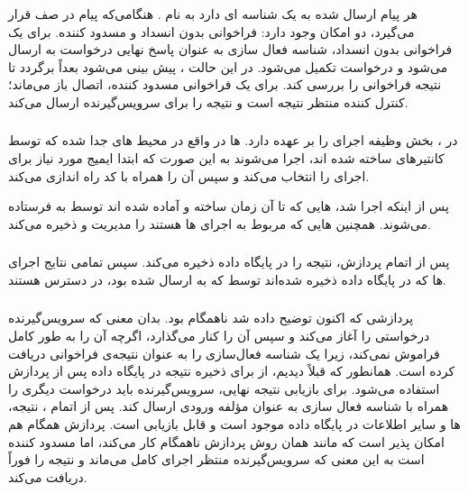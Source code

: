 هر پیام ارسال شده به یک  شناسه ای دارد به نام . هنگامی‌که پیام در صف  قرار می‌گیرد، دو امکان وجود دارد: فراخوانی بدون انسداد و مسدود کننده. برای یک فراخوانی بدون انسداد‌، شناسه فعال سازی به عنوان پاسخ نهایی درخواست به  ارسال می‌شود و درخواست تکمیل می‌شود. در این حالت ، پیش بینی می‌شود  بعداً برگردد تا نتیجه فراخوانی را بررسی کند. برای یک فراخوانی مسدود کننده، اتصال باز می‌ماند؛ کنترل کننده منتظر نتیجه  است و نتیجه را برای سرویس‌گیرنده ارسال می‌کند.

\subsubsection*{}

در ، بخش  وظیفه اجرای  را بر عهده دارد.  ها در واقع در محیط های جدا شده که توسط کانتیرهای  ساخته شده اند، اجرا می‌شوند به این صورت که  ابتدا ایمیج  مورد نیاز برای اجرای  را انتخاب می‌کند و سپس آن را همراه با کد  راه اندازی می‌کند.

پس از اینکه  اجرا شد،  هایی که تا آن زمان ساخته و آماده شده اند توسط  به  فرستاده می‌شوند.  همچنین  هایی که مربوط به اجرای  ها هستند را مدیریت و ذخیره می‌کند.

\subsubsection*{}

پس از اتمام پردازش،  نتیجه را در پایگاه داده  ذخیره می‌کند. سپس تمامی نتایج اجرای  ها که در پایگاه داده ذخیره شده‌اند توسط  که به  ارسال شده بود، در دسترس هستند.

\subsubsection*{}

پردازشی که اکنون توضیح داده شد ناهمگام بود. بدان معنی که سرویس‌گیرنده درخواستی را آغاز می‌کند و سپس آن را کنار می‌گذارد، اگرچه آن را به طور کامل فراموش نمی‌کند، زیرا یک شناسه فعال‌سازی را به عنوان نتیجه‌ی فراخوانی دریافت کرده است. همانطور که قبلاً دیدیم، از  برای ذخیره نتیجه در پایگاه داده پس از پردازش استفاده می‌شود. برای بازیابی نتیجه نهایی، سرویس‌گیرنده باید درخواست دیگری را همراه با شناسه فعال سازی به عنوان مؤلفه ورودی ارسال کند. پس از اتمام ، نتیجه،  ها و سایر اطلاعات در پایگاه داده موجود است و قابل بازیابی است. پردازش همگام هم امکان پذیر است که مانند همان روش پردازش ناهمگام کار می‌کند، اما مسدود کننده است به این معنی که سرویس‌گیرنده منتظر اجرای کامل  می‌ماند و نتیجه را فوراً دریافت می‌کند.
